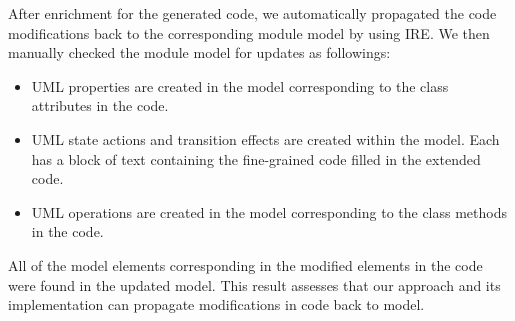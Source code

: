 After enrichment for the generated code, we automatically propagated the code modifications back to the corresponding module model by using IRE.
We then manually checked the module model for updates as followings:

\begin{itemize}[\footnotesize]
	\item UML properties are created in the model corresponding to the class attributes in the code.
	
	\item UML state actions and transition effects are created within the model. Each has a block of text containing the fine-grained code filled in the extended code.
	
	\item UML operations are created in the model corresponding to the class methods in the code.
\end{itemize}

All of the model elements corresponding in the modified elements in the code were found in the updated model.
This result assesses that our approach and its implementation can propagate modifications in code back to model.

